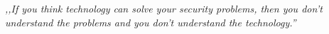 \chapter*{}

\mbox{}

\textit{,,If you think technology can solve your security problems, then you don't understand the problems and you don't understand the technology.''}


